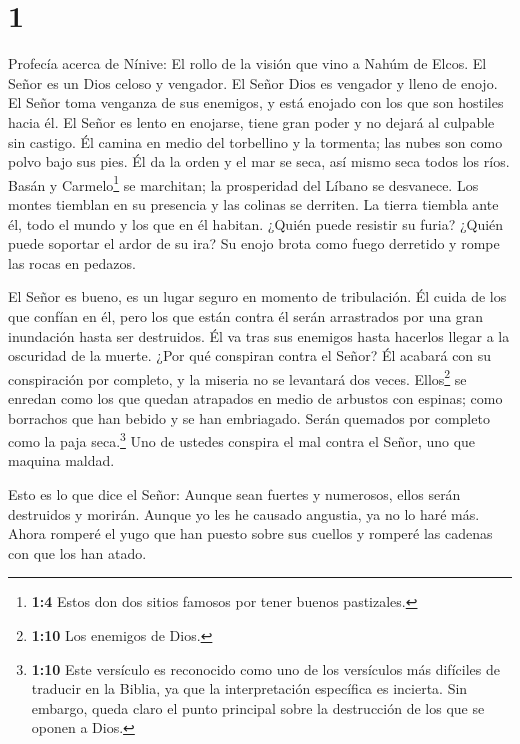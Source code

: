 \hypertarget{section}{%
\section{1}\label{section}}

 Profecía acerca de Nínive: El rollo de la visión que vino
a Nahúm de Elcos.  El Señor es un Dios celoso y vengador.
El Señor Dios es vengador y lleno de enojo. El Señor toma venganza de
sus enemigos, y está enojado con los que son hostiles hacia él.
 El Señor es lento en enojarse, tiene gran poder y no
dejará al culpable sin castigo. Él camina en medio del torbellino y la
tormenta; las nubes son como polvo bajo sus pies.  Él da
la orden y el mar se seca, así mismo seca todos los ríos. Basán y
Carmelo\footnote{\textbf{1:4} Estos don dos sitios famosos por tener
  buenos pastizales.} se marchitan; la prosperidad del Líbano se
desvanece.  Los montes tiemblan en su presencia y las
colinas se derriten. La tierra tiembla ante él, todo el mundo y los que
en él habitan.  ¿Quién puede resistir su furia? ¿Quién
puede soportar el ardor de su ira? Su enojo brota como fuego derretido y
rompe las rocas en pedazos.

 El Señor es bueno, es un lugar seguro en momento de
tribulación. Él cuida de los que confían en él,  pero los
que están contra él serán arrastrados por una gran inundación hasta ser
destruidos. Él va tras sus enemigos hasta hacerlos llegar a la oscuridad
de la muerte.  ¿Por qué conspiran contra el Señor? Él
acabará con su conspiración por completo, y la miseria no se levantará
dos veces.  Ellos\footnote{\textbf{1:10} Los enemigos de
  Dios.} se enredan como los que quedan atrapados en medio de arbustos
con espinas; como borrachos que han bebido y se han embriagado. Serán
quemados por completo como la paja seca.\footnote{\textbf{1:10} Este
  versículo es reconocido como uno de los versículos más difíciles de
  traducir en la Biblia, ya que la interpretación específica es
  incierta. Sin embargo, queda claro el punto principal sobre la
  destrucción de los que se oponen a Dios.}  Uno de
ustedes conspira el mal contra el Señor, uno que maquina maldad.

 Esto es lo que dice el Señor: Aunque sean fuertes y
numerosos, ellos serán destruidos y morirán. Aunque yo les he causado
angustia, ya no lo haré más.  Ahora romperé el yugo que
han puesto sobre sus cuellos y romperé las cadenas con que los han
atado.

